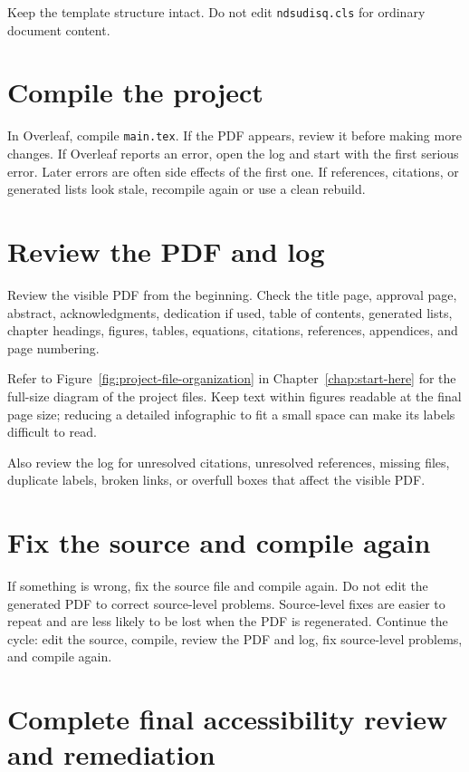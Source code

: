 Keep the template structure intact. Do not edit \texttt{ndsudisq.cls} for ordinary document content.

\section{Compile the project}
\label{sec:quick-compile-project}

In Overleaf, compile \texttt{main.tex}. If the PDF appears, review it before making more changes. If Overleaf reports an error, open the log and start with the first serious error. Later errors are often side effects of the first one. If references, citations, or generated lists look stale, recompile again or use a clean rebuild.

\section{Review the PDF and log}
\label{sec:quick-review-output}

Review the visible PDF from the beginning. Check the title page, approval page, abstract, acknowledgments, dedication if used, table of contents, generated lists, chapter headings, figures, tables, equations, citations, references, appendices, and page numbering.

Refer to Figure~\ref{fig:project-file-organization} in Chapter~\ref{chap:start-here} for the full-size diagram of the project files. Keep text within figures readable at the final page size; reducing a detailed infographic to fit a small space can make its labels difficult to read.

Also review the log for unresolved citations, unresolved references, missing files, duplicate labels, broken links, or overfull boxes that affect the visible PDF.

\section{Fix the source and compile again}
\label{sec:quick-fix-source}

If something is wrong, fix the source file and compile again. Do not edit the generated PDF to correct source-level problems. Source-level fixes are easier to repeat and are less likely to be lost when the PDF is regenerated. Continue the cycle: edit the source, compile, review the PDF and log, fix source-level problems, and compile again.

\section{Complete final accessibility review and remediation}
\label{sec:quick-final-remediation}

